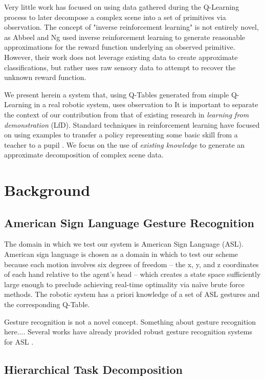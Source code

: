 \documentclass[letterpaper]{article}
\begin{document}
Very little work has focused on using data gathered during the Q-Learning
process to later decompose a complex scene into a set of primitives via
observation.  The concept of "inverse reinforcement learning" is not entirely
novel, as Abbeel and Ng \cite{InverseRL} used inverse reinforcement learning
to generate reasonable approximations for the reward function underlying an
observed primitive.  However, their work does not leverage existing data
to create approximate classifications, but rather uses raw sensory data to
attempt to recover the unknown reward function.

We present herein a system that, using Q-Tables generated from simple
Q-Learning in a real robotic system, uses observation to 
It is important to separate the context of our contribution from that of
existing research in \textit{learning from demonstration} (LfD).  Standard
techniques in reinforcement learning have focused on using examples to
transfer a policy representing some basic skill from a teacher to a
pupil \cite{JenkinsLFD,LFDSurvey}.  We focus on the use of
\textit{existing knowledge} to generate an approximate decomposition of
complex scene data.

\section{Background}
\label{sec:background}
\subsection{American Sign Language Gesture Recognition}
The domain in which we test our system is American Sign Language (ASL).
American sign language is chosen as a domain in which to test our scheme
because each motion involves six degrees of freedom -- the x, y, and z
coordinates of each hand relative to the agent's head -- which creates a
state space sufficiently large enough to preclude achieving real-time
optimality via na\"ive brute force methods.  The
robotic system has a priori knowledge of a set of ASL gestures and the
corresponding Q-Table.

Gesture recognition is not a novel concept.  Something about gesture recognition
here...\cite{HandGestures}\cite{HSMMRecognition}\cite{POMDPGesture}.
Several works have already provided robust gesture recognition systems for
ASL \cite{HoughASL}\cite{ASLRealTime}\cite{MotionASL}.

\subsection{Hierarchical Task Decomposition}
\cite{Hierarchical}
\end{document}
